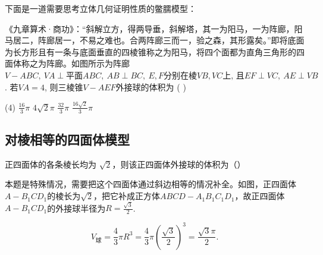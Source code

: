 下面是一道需要思考立体几何证明性质的鳖臑模型：

\vspace{1em}

\begin{example}
    《九章算术·商功》：“斜解立方，得两导垂，斜解塔，其一为阳马，一为阵廊，阳马居二，阵廊居一，不易之难也。合两阵廊三而一，验之森，其形露矣。”即将底面为长方形且有一条与底面垂直的四棱锥称之为阳马，将四个面都为直角三角形的四面体称之为阵廊。如图所示为阵廊
    $V - ABC, \ V A \perp \text{平面}ABC, \ AB \perp BC, \ E, F \text{分别在棱} VB, VC \text{上, 且} EF \perp VC, \ AE \perp VB$.
    若$VA = 4$, 则三棱锥$V - AEF$外接球的体积为 ( \hspace{1.5cm} )

    \begin{figure} [H]
        \centering
        \resizebox{0.2\textwidth}{!}{}
    \end{figure}

    \begin{tasks}(4)
        \task $\frac{16}{3} \pi$
        \task $4\sqrt{2} \pi$
        \task $\frac{32}{3} \pi$
        \task $\frac{16\sqrt{2}}{3} \pi$
    \end{tasks}
\end{example}

\subsection{对棱相等的四面体模型}

\begin{example}
    正四面体的各条棱长均为 $\sqrt{2}$，则该正四面体外接球的体积为（\hspace{1.5cm}）
\end{example}

\begin{solution}
    本题是特殊情况，需要把这个四面体通过斜边相等的情况补全。如图，正四面体$A - B_1CD_1$的棱长为$\sqrt{2}$，把它补成正方体$ABCD - A_1B_1C_1D_1$，故正四面体$A - B_1CD_1$的外接球半径为$R = \frac{\sqrt{3}}{2}$.

    \[
        V_{\text{球}} = \frac{4}{3}\pi R^3 = \frac{4}{3}\pi \left( \frac{\sqrt{3}}{2} \right)^3 = \frac{\sqrt{3}\pi}{2}.
    \]

    \begin{figure} [H]
        \centering
        \resizebox{0.3\textwidth}{!}{}
    \end{figure}

\end{solution}

